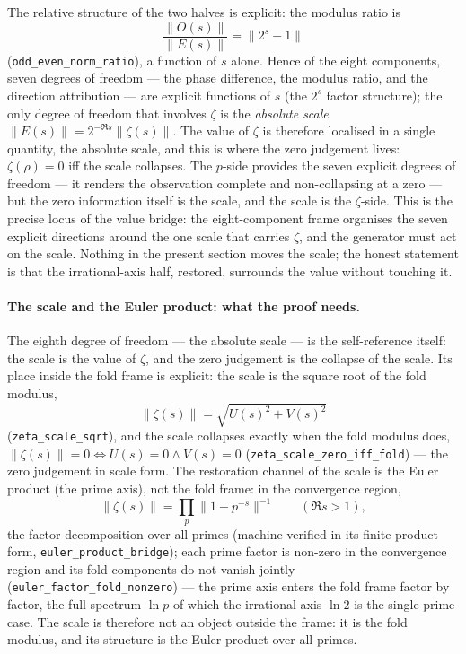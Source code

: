 \documentclass{article}
\newcommand{\zt}{\zeta}
\begin{document}
The relative structure of the two halves is explicit: the modulus
ratio is
\begin{equation}
  \frac{\|O(s)\|}{\|E(s)\|}=\|2^s-1\|
\end{equation}
(\texttt{odd\_even\_norm\_ratio}), a function of $s$ alone. Hence of
the eight components, seven degrees of freedom --- the phase
difference, the modulus ratio, and the direction attribution --- are
explicit functions of $s$ (the $2^s$ factor structure); the only
degree of freedom that involves $\zt$ is the \emph{absolute scale}
$\|E(s)\|=2^{-\Re s}\|\zt(s)\|$. The value of $\zt$ is therefore
localised in a single quantity, the absolute scale, and this is where
the zero judgement lives: $\zt(\rho)=0$ iff the scale collapses.
The $p$-side provides the seven explicit degrees of freedom --- it
renders the observation complete and non-collapsing at a zero --- but
the zero information itself is the scale, and the scale is the
$\zt$-side. This is the precise locus of the value bridge: the
eight-component frame organises the seven explicit directions around
the one scale that carries $\zt$, and the generator must act on the
scale. Nothing in the present section moves the scale; the honest
statement is that the irrational-axis half, restored, surrounds the
value without touching it.

\paragraph{The scale and the Euler product: what the proof needs.}
The eighth degree of freedom --- the absolute scale --- is the
self-reference itself: the scale is the value of $\zt$, and the zero
judgement is the collapse of the scale. Its place inside the fold
frame is explicit: the scale is the square root of the fold modulus,
\begin{equation}
  \|\zt(s)\|=\sqrt{U(s)^2+V(s)^2}
\end{equation}
(\texttt{zeta\_scale\_sqrt}), and the scale collapses exactly when the
fold modulus does, $\|\zt(s)\|=0\iff U(s)=0\wedge V(s)=0$
(\texttt{zeta\_scale\_zero\_iff\_fold}) --- the zero judgement in scale
form. The restoration channel of the scale is the Euler product (the
prime axis), not the fold frame: in the convergence region,
\begin{equation}
  \|\zt(s)\|=\prod_p\|1-p^{-s}\|^{-1}\qquad(\Re s>1),
\end{equation}
the factor decomposition over all primes (machine-verified in its
finite-product form, \texttt{euler\_product\_bridge}); each prime
factor is non-zero in the convergence region and its fold components
do not vanish jointly
(\texttt{euler\_factor\_fold\_nonzero}) --- the prime axis enters the
fold frame factor by factor, the full spectrum $\ln p$ of which the
irrational axis $\ln 2$ is the single-prime case. The scale is
therefore not an object outside the frame: it is the fold modulus, and
its structure is the Euler product over all primes.
\end{document}

